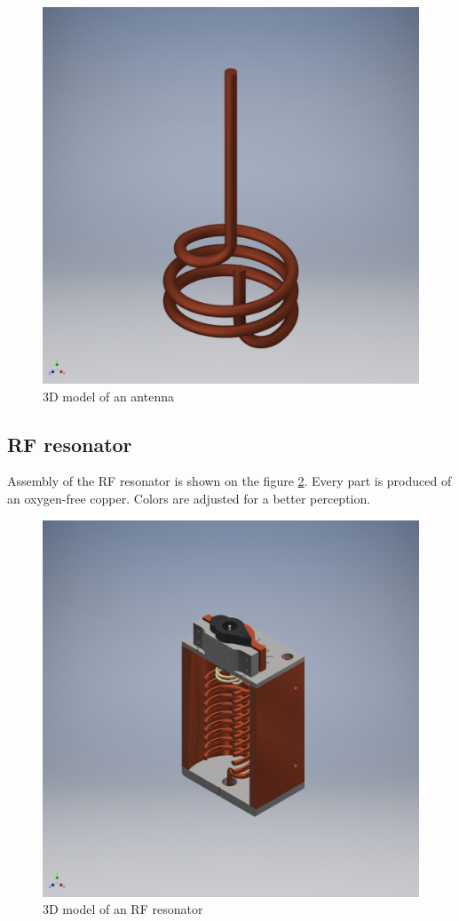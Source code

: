 \begin{figure}[h]
	\centering
	\includegraphics[width=\textwidth]{images/antenna}
	\caption{3D model of an antenna}
	\label{fig:antenna}
\end{figure}

\clearpage
\subsection{RF resonator}
\label{subsection:rf_resonator_3d}
Assembly of the RF resonator is shown on the figure \ref{fig:resonator}. Every part is produced of an oxygen-free copper. Colors are adjusted for a better perception.

\begin{figure}[h]
	\centering
	\includegraphics[width=\textwidth]{images/resonator}
	\caption{3D model of an RF resonator}
	\label{fig:resonator}
\end{figure}